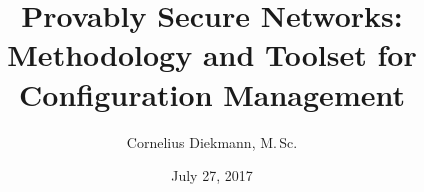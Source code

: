 \usepackage[utf8]{inputenc}
\usepackage{packages}
\usepackage{beamermods}



\usepackage{bibentry}
\nobibliography*

\author[C.\ Diekmann]{Cornelius Diekmann, M.\,Sc.}
\title[Provably Secure Networks: Methodology and Toolset for Configuration Management]{Provably Secure Networks:\\Methodology and Toolset for Configuration Management}
\date{July 27, 2017}

\usepackage{pgfpages}
\usepackage{ifthen}




\newcommand{\hairspace}{\hspace{1pt}}
\newcommand{\eg}{\mbox{e.\hairspace{}g.,} }  %
\newcommand{\ie}{\mbox{i.\hairspace{}e.,} }  %
\newcommand{\Ie}{\mbox{I.\hairspace{}e.,} }  %
\newcommand{\cf}{\mbox{cf.}\ }
\newcommand{\etal}{\mbox{et~al.}\ }

\usepackage{fancyvrb}

\usepackage{IEEEtrantools}

\usepackage{varwidth}

\newcommand{\mvar}[1]{\ensuremath{\mathit{#1}}}
\newcommand{\mdef}[1]{\ensuremath{\mathsf{#1}}}
\newcommand{\mfun}[1]{\mdef{#1}}
\newcommand\mconstr[1]{\mdef{#1}}
\newcommand\mctrl[1]{\ensuremath{\mathbf{#1}}}


\newcommand{\topos}{\emph{topoS}}
\newcommand{\fffuu}{\emph{{f}{f}{f}uu}}

\newcommand\iptables{{iptables}}


\newcommand{\BigO}{\mathcal{O}}




\newcommand\mdoubleplus{\ensuremath{\mathbin{+\mkern-10mu+}}}
\newcommand\lstapp{\ensuremath{\mathbin{:\mkern-1mu:\mkern-1mu:}}} %
\newcommand\lstcons{\ensuremath{\mathbin{:\mkern-1mu:}}} %

\newcommand{\free}[1]{\textcolor{TUMDarkerBlue}{#1}}
\newcommand{\bound}[1]{\textcolor{TUMDarkGreen}{#1}}
\newcommand{\boundi}[1]{\textcolor{TUMGreen}{#1}}


